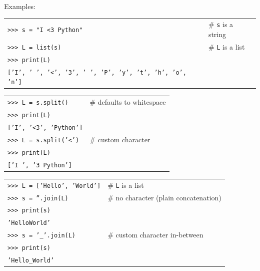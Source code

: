 \documentclass[t,handout,9pt]{beamer}
\begin{document}
\begin{frame}
Examples:
\vfill
\begin{table}[]
\begin{flushleft}
\begin{tabular}{ll}
\texttt{>{}>{}> s = "I <3 Python"} &  \# \texttt{s} is a string\\
\texttt{>{}>{}> L = list(s)} & \# \texttt{L} is a list \\
\texttt{>{}>{}> print(L)} & \\
\texttt{['I', ' ', '<', '3', ' ', 'P', 'y', 't', 'h', 'o', 'n']} & \\
\end{tabular}
\end{flushleft}
\end{table}
\vfill
\begin{table}[]
\begin{flushleft}
\begin{tabular}{ll}
\texttt{>{}>{}> L = s.split()} & \# defaults to whitespace \\
\texttt{>{}>{}> print(L)} & \\
\texttt{['I', '<3', 'Python']} & \\
\texttt{>{}>{}> L = s.split('<')} & \# custom character \\
\texttt{>{}>{}> print(L)} & \\
\texttt{['I ', '3 Python']} & \\
\end{tabular}
\end{flushleft}
\end{table}
\vfill
\begin{table}[]
\begin{flushleft}
\begin{tabular}{ll}
\texttt{>{}>{}> L = ['Hello', 'World']} & \# \texttt{L} is a list \\
\texttt{>{}>{}> s = ''.join(L)} & \# no character (plain concatenation) \\
\texttt{>{}>{}> print(s)} & \\
\texttt{'HelloWorld'} & \\
\texttt{>{}>{}> s = '\_'.join(L)} & \# custom character in-between \\
\texttt{>{}>{}> print(s)} & \\
\texttt{'Hello\_World'} & \\
\end{tabular}
\end{flushleft}
\end{table}
\end{frame}
%
\end{document}
